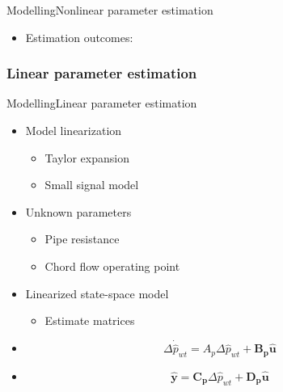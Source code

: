 \begin{frame}{Modelling}{Nonlinear parameter estimation}
\begin{itemize}
	\item<1-> Estimation outcomes: 	
\end{itemize}

\begin{figure}[H]
  \centering
  \begin{minipage}[h]{0.45\textwidth}
    
  \end{minipage}
  \hfill
  \begin{minipage}[h]{0.45\textwidth}
   
  \end{minipage}
\end{figure}
\end{frame}

\subsubsection{Linear parameter estimation}

\begin{frame}{Modelling}{Linear parameter estimation}
\begin{itemize}
	\item<1-> Model linearization
	\begin{itemize}
		\item<1-> Taylor expansion
		\item<1-> Small signal model
	\end{itemize}	
\end{itemize}

\begin{itemize}
	\item<2-> Unknown parameters
	\begin{itemize}
		\item<2-> Pipe resistance
		\item<2-> Chord flow operating point
	\end{itemize}	
\end{itemize}

\begin{itemize}
	\item<3-> Linearized state-space model
	\begin{itemize}
		\item<3-> Estimate matrices
	\end{itemize}
\end{itemize}	

\begin{itemize}
	\item<3->[]
		\begin{equation}
		\Delta \dot{\hat{p}}_{wt} =  A_p \Delta \hat{p}_{wt}  + \pmb{B_p}\pmb{\hat{u}} 
		\end{equation}
	\item<3->[]
		\begin{equation}
		\pmb{\hat{y}} = \pmb{C_{p}} \Delta \hat{p}_{wt} + \pmb{D_p} \pmb{\hat{u}}
		\end{equation}	
\end{itemize}
\end{frame}


